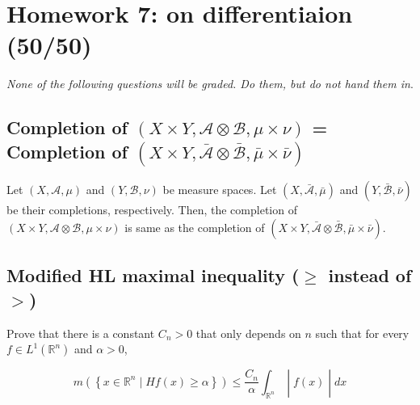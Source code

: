 \chapter{Homework 7: on differentiaion (50/50)}\label{homework-7-on-differentiaion-5050}

\emph{None of the following questions will be graded. Do them, but do not hand them in}.

\section{\texorpdfstring{Completion of \((X \times Y,\mathcal{A} \otimes \mathcal{B},\mu \times \nu)\) = Completion of \((X \times Y,\bar{\mathcal{A}} \otimes \bar{\mathcal{B}},\bar{\mu} \times \bar{\nu})\)}{Completion of (X \textbackslash times Y,\textbackslash mathcal\{A\} \textbackslash otimes \textbackslash mathcal\{B\},\textbackslash mu \textbackslash times \textbackslash nu) = Completion of (X \textbackslash times Y,\textbackslash bar\{\textbackslash mathcal\{A\}\} \textbackslash otimes \textbackslash bar\{\textbackslash mathcal\{B\}\},\textbackslash bar\{\textbackslash mu\} \textbackslash times \textbackslash bar\{\textbackslash nu\})}}\label{completion-of-xtimes-y-mathcalaotimes-mathcalb-mutimes-nu-completion-of-xtimes-y-barmathcalaotimes-barmathcalb-barmutimes-barnu}

Let \((X,\mathcal{A},\mu)\) and \((Y,\mathcal{B},\nu)\) be measure spaces. Let \((X,\bar{\mathcal{A}},\bar{\mu})\) and \((Y,\bar{\mathcal{B}},\bar{\nu})\) be their completions, respectively. Then, the completion of \((X \times Y,\mathcal{A} \otimes \mathcal{B},\mu \times \nu)\) is same as the completion of \((X \times Y,\bar{\mathcal{A}} \otimes \bar{\mathcal{B}},\bar{\mu} \times \bar{\nu})\).

\section{\texorpdfstring{Modified HL maximal inequality (\(\geq\) instead of \(>\))}{Modified HL maximal inequality (\textbackslash geq instead of \textgreater)}}\label{modified-hl-maximal-inequality-geq-instead-of}

Prove that there is a constant \(C_{n} > 0\) that only depends on \(n\) such that for every \(f \in L^{1}(\mathbb{R}^{n})\) and \(\alpha > 0\),

\[\left. m(\left\{ {x \in \mathbb{R}^{n} \mid Hf(x) \geq \alpha} \right\}) \leq \frac{C_{n}}{\alpha}\int_{\mathbb{R}^{n}} \middle| f(x) \middle| dx \right.\]

